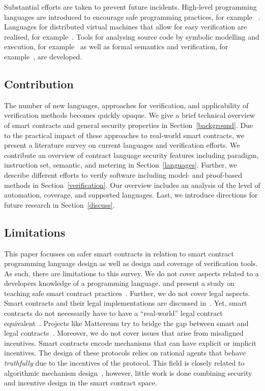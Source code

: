 Substantial efforts are taken to prevent future incidents. 
High-level programming languages are introduced to encourage safe programming practices, for example ~\cite{Hirai2018Bamboo,Ethereum2018Vyper,Schrans2018}.
Languages for distributed virtual machines that allow for easy verification are realised, for example~\cite{Sergey2018,DynamicLedgerSolutions2017,Popejoy2017,Kasampalis2018}.
Tools for analysing source code by symbolic modelling and execution, for example~\cite{Luu2016,Tsankov2017,Kalra2018,Albert2018} as well as formal semantics and verification, for example~\cite{Bhargavan2016,Hildenbrandt2017,Hirai2017}, are developed.

\subsection{Contribution} The number of new languages, approaches for verification, and applicability of verification methods becomes quickly opaque. 
We give a brief technical overview of smart contracts and general security properties in Section~\ref{background}. Due to the practical impact of these approaches to real-world smart contracts, we present a literature survey on current languages and verification efforts.
We contribute an overview of contract language security features including paradigm, instruction set, semantic, and metering in Section~\ref{languages}.
Further, we describe different efforts to verify software including model- and proof-based methods in Section~\ref{verification}. Our overview includes an analysis of the level of automation, coverage, and supported languages.
Last, we introduce directions for future research in Section~\ref{discuss}.

\subsection{Limitations}
This paper focusses on safer smart contracts in relation to smart contract programming language design as well as design and coverage of verification tools.
As such, there are limitations to this survey.
We do not cover aspects related to a developers knowledge of a programming language.
\citeauthor{Delmolino2016} and \citeauthor{DiAngelo2019} present a study on teaching safe smart contract practices~\cite{Delmolino2016,DiAngelo2019}.
Further, we do not cover legal aspects.
Smart contracts and their legal implementations are discussed in~\cite{Neal.2003,Governatori2006,Clack2016}.
Yet, smart contracts do not necessarily have to have a ``real-world'' legal contract equivalent~\cite{Szabo1997,Nakamoto2008,Buterin2013}. 
Projects like Mattereum try to bridge the gap between smart and legal contracts~\cite{Gupta}.
Moreover, we do not cover issues that arise from misaligned incentives.
Smart contracts encode mechanisms that can have explicit or implicit incentives.
The design of these protocols relies on rational agents that behave \emph{truthfully} due to the incentives of the protocol.
This field is closely related to algorithmic mechanism design~\cite{Nisan2007}, however, little work is done combining security and incentive design in the smart contract space.

